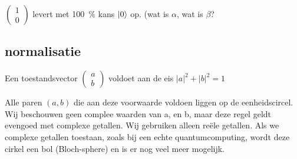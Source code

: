 \documentclass[../../main.tex]{subfiles}
\begin{document}
$\begin{pmatrix}
1\\
0
\end{pmatrix}
$
levert met \SI{100}{\percent} kans $\ket{0}$ op. (wat is $\alpha$, wat is $\beta$?
\subsection{normalisatie}
Een toestandsvector $\begin{pmatrix}
a\\
b
\end{pmatrix}$
voldoet aan de eis 
$|a|^2+|b|^2=1$

Alle paren $(a,b)$ die aan deze voorwaarde voldoen liggen op de eenheidscircel. Wij beschouwen geen complee waarden van a, en b, maar deze regel geldt evengoed met complexe getallen. Wij gebruiken alleen re\"ele getallen. Als we complexe getallen toestaan, zoals bij een echte quantumcomputing, wordt deze cirkel een bol (Bloch-sphere) en is er nog veel meer mogelijk.
\end{document}
